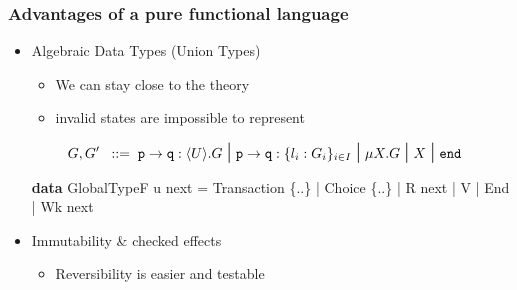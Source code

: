 \documentclass[12pt]{beamer}
\newenvironment{Shaded}{}{}
\newcommand{\KeywordTok}[1]{\textcolor[rgb]{0.00,0.44,0.13}{\textbf{#1}}}
\newcommand{\DataTypeTok}[1]{\textcolor[rgb]{0.56,0.13,0.00}{#1}}
\newcommand{\FunctionTok}[1]{\textcolor[rgb]{0.02,0.16,0.49}{#1}}
\newcommand{\NormalTok}[1]{#1}
\begin{document}
\begin{frame}[fragile]
\frametitle{Advantages of a pure functional language}


\begin{itemize}
    \item Algebraic Data Types (Union Types) 
        \begin{itemize}
            \item         We can stay close to the theory 
            \item         invalid states are impossible to represent
        \end{itemize} \footnotesize
\begin{align*}
    G, G'  \bnfis & \gtcom{p}{q}{U}{G} %
    \sbnfbar
    \gtcho{p}{q}{\lbl_i}{G_i} %
    \sbnfbar %
    \mu X. G \sbnfbar X \sbnfbar \gend 
\end{align*}
\normalsize

\begin{Shaded}
\begin{Highlighting}[]
\KeywordTok{data} \DataTypeTok{GlobalTypeF}\NormalTok{ u next }\FunctionTok{=} 
    \DataTypeTok{Transaction}\NormalTok{ \{}\FunctionTok{..}\NormalTok{\} }\FunctionTok{|} \DataTypeTok{Choice}\NormalTok{ \{}\FunctionTok{..}\NormalTok{\}  }\FunctionTok{|} \DataTypeTok{R}\NormalTok{ next }\FunctionTok{|} \DataTypeTok{V} \FunctionTok{|} \DataTypeTok{End} \FunctionTok{|} \DataTypeTok{Wk}\NormalTok{ next}
\end{Highlighting}
\end{Shaded}


        \vspace*{0.2cm}
    \item Immutability \& checked effects  
        \begin{itemize}
            \item Reversibility is easier and testable 
        \end{itemize}

\end{itemize}

\end{frame}
\end{document}
